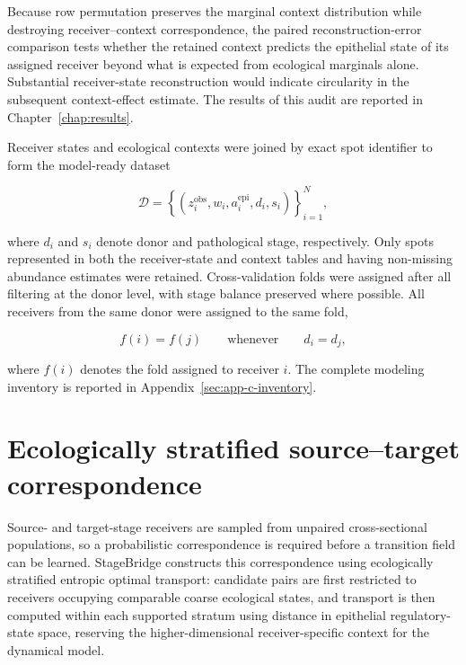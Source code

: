 Because row permutation preserves the marginal context distribution while destroying receiver--context correspondence, the paired reconstruction-error comparison tests whether the retained context predicts the epithelial state of its assigned receiver beyond what is expected from ecological marginals alone.
Substantial receiver-state reconstruction would indicate circularity in the subsequent context-effect estimate. The results of this audit are reported in Chapter~\ref{chap:results}.

Receiver states and ecological contexts were joined by exact spot identifier to form the model-ready dataset

\begin{equation}
\mathcal{D}
=
\left\{
\left(
z_i^{\mathrm{obs}},
w_i,
a_i^{\mathrm{epi}},
d_i,
s_i
\right)
\right\}_{i=1}^{N},
\label{eq:methods-modeling-dataset}
\end{equation}

where \(d_i\) and \(s_i\) denote donor and pathological stage, respectively.
Only spots represented in both the receiver-state and context tables and having non-missing abundance estimates were retained. Cross-validation folds were assigned after all filtering at the donor level, with stage balance preserved where possible. All receivers from the same donor were assigned to the same fold,

\begin{equation}
f(i)=f(j)
\qquad
\text{whenever}
\qquad
d_i=d_j,
\end{equation}

where \(f(i)\) denotes the fold assigned to receiver \(i\). The complete modeling inventory is reported in Appendix~\ref{sec:app-c-inventory}.

\section{Ecologically stratified source--target correspondence}
\label{sec:methods-coupling}

Source- and target-stage receivers are sampled from unpaired cross-sectional
populations, so a probabilistic correspondence is required before a transition
field can be learned. StageBridge constructs this correspondence using
ecologically stratified entropic optimal transport: candidate pairs are first
restricted to receivers occupying comparable coarse ecological states, and
transport is then computed within each supported stratum using distance in
epithelial regulatory-state space, reserving the higher-dimensional
receiver-specific context for the dynamical model.

